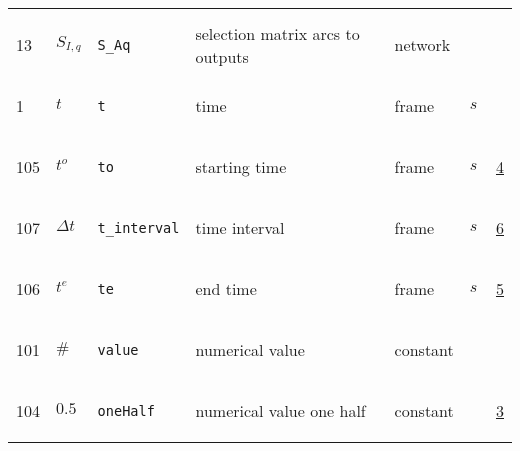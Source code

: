 \begin{longtable}{|p{1cm}|p{2.5cm}|p{4.5cm}|p{8cm}|p{3.0cm}|p{3cm}|p{1cm}|}
             & \\
            13
             & \hypertarget{"v:13"}{ $ {{S}}{_{I, q}} $}
             & \verb|S_Aq|
             & selection matrix arcs to outputs
             & \begin{lay}network \end{lay}
             & $  $
             & \\
            1
             & \hypertarget{"v:1"}{ $ {t}{_{}} $}
             & \verb|t|
             & time
             & \begin{lay}frame \end{lay}
             & $ s \, $
             & \\
            105
             & \hypertarget{"v:105"}{ $ {{t^o}}{_{}} $}
             & \verb|to|
             & starting time
             & \begin{lay}frame \end{lay}
             & $ s \, $
             &                 \hyperlink{"e:4"}{ 4 }
                 \\
            107
             & \hypertarget{"v:107"}{ $ {{\Delta t}}{_{}} $}
             & \verb|t_interval|
             & time interval
             & \begin{lay}frame \end{lay}
             & $ s \, $
             &                 \hyperlink{"e:6"}{ 6 }
                 \\
            106
             & \hypertarget{"v:106"}{ $ {{t^e}}{_{}} $}
             & \verb|te|
             & end time
             & \begin{lay}frame \end{lay}
             & $ s \, $
             &                 \hyperlink{"e:5"}{ 5 }
                 \\
            101
             & \hypertarget{"v:101"}{ $ {{\#}}{_{}} $}
             & \verb|value|
             & numerical value
             & \begin{lay}constant \end{lay}
             & $  $
             & \\
            104
             & \hypertarget{"v:104"}{ $ {0.5}{_{}} $}
             & \verb|oneHalf|
             & numerical value one half
             & \begin{lay}constant \end{lay}
             & $  $
             &                 \hyperlink{"e:3"}{ 3 }
                 \\

\end{longtable}
